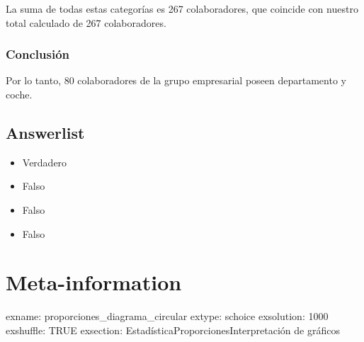 \documentclass[
]{article}
\providecommand{\tightlist}{%
  \setlength{\itemsep}{0pt}\setlength{\parskip}{0pt}}
\begin{document}
La suma de todas estas categorías es 267 colaboradores, que coincide con
nuestro total calculado de 267 colaboradores.

\subsubsection{Conclusión}\label{conclusiuxf3n}

Por lo tanto, 80 colaboradores de la grupo empresarial poseen
departamento y coche.

\subsection{Answerlist}\label{answerlist-1}

\begin{itemize}
\tightlist
\item
  Verdadero
\item
  Falso
\item
  Falso
\item
  Falso
\end{itemize}

\section{Meta-information}\label{meta-information}

exname: proporciones\_diagrama\_circular extype: schoice exsolution:
1000 exshuffle: TRUE exsection:
Estadística\textbar Proporciones\textbar Interpretación de gráficos
\end{document}
